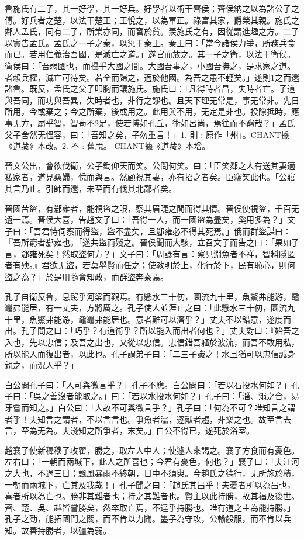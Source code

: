 \begin{pinyinscope}
魯施氏有二子，其一好學，其一好兵。好學者以術干齊侯；齊侯納之以為諸公子之傅。好兵者之楚，以法干楚王；王悅之，以為軍正。祿富其家，爵榮其親。施氏之鄰人孟氏，同有二子，所業亦同，而窘於貧。羨施氏之有，因從謂進趣之方。二子以實告孟氏。孟氏之一子之秦，以愆干秦王。秦王曰：「當今諸侯力爭，所務兵食而已。若用仁義治吾國，是滅亡之道。」遂官而放之。其一子之衛，以法干衛侯。衛侯曰：「吾弱國也，而攝乎大國之間。大國吾事之，小國吾撫之，是求家之道。者賴兵權，滅亡可待矣。若全而歸之，適於他國。為吾之患不輕矣。」遂則1之而還諸魯。既反，孟氏之父子叩胸而讓施氏。施氏曰：「凡得時者昌，失時者亡。子道與吾同，而功與吾異，失時者也，非行之謬也。且天下理无常是，事无常非。先日所用，今或棄之；今之所棄，後或用之。此用與不用，无定是非也。投隙抵時，應事无方，屬乎智，智苟不2足，使若博如孔丘，術如呂尚，焉往而不窮哉？」孟氏父子舍然无慍容，曰：「吾知之矣，子勿重言！」1. 則 : 原作「州」。CHANT據《道藏》本改。2. 不 : 舊脫。 CHANT據《道藏》本增。

晉文公出，會欲伐衛，公子鋤仰天而笑。公問何笑。曰：「臣笑鄰之人有送其妻適私家者，道見桑婦，悅而與言。然顧視其妻，亦有招之者矣。臣竊笑此也。「公寤其言乃止。引師而還，未至而有伐其北鄙者矣。

晉國苦盜，有郄雍者，能視盜之眼，察其眉睫之閒而得其情。晉侯使視盜，千百无遺一焉。晉侯大喜，告趙文子曰：「吾得一人，而一國盜為盡矣，奚用多為？」文子曰：「吾君恃伺察而得盜，盜不盡矣，且郄雍必不得其死焉。」俄而群盜謀曰：『吾所窮者郄雍也。「遂共盜而殘之。晉侯聞而大駭，立召文子而告之曰：「果如子言，郄雍死矣！然取盜何方？」文子曰：「周諺有言：察見淵魚者不祥，智料隱匿者有殃。』君欲无盜，若莫舉賢而任之；使教明於上，化行於下，民有恥心，則何盜之為？」於是用隨會知政，而群盜奔秦焉。

孔子自衛反魯，息駕乎河梁而觀焉。有懸水三十仞，圜流九十里，魚鱉弗能游，黿鼉弗能居，有一丈夫，方將厲之。孔子使人並涯止之曰：「此懸水三十仞，圜流九十里，魚鱉弗能游，黿鼉弗能居也。意者難可以濟乎？」丈夫不以錯意，遂度而出。孔子問之曰：「巧乎？有道術乎？所以能入而出者何也？」丈夫對曰：『始吾之入也，先以忠信；及吾之出也，又從以忠信。忠信錯吾軀於波流，而吾不敢用私，所以能入而復出者，以此也。孔子謂弟子曰：「二三子識之！水且猶可以忠信誠身親之，而況人乎？」

白公問孔子曰：「人可與微言乎？」孔子不應。白公問曰：「若以石投水何如？」孔子曰：「吳之善沒者能取之。」曰：「若以水投水何如？」孔子曰：「淄、澠之合，易牙嘗而知之。」白公曰：「人故不可與微言乎？」孔子曰：「何為不可？唯知言之謂者乎！夫知言之謂者，不以言言也。爭魚者濡，逐獸者趨，非樂之也。故至言去言，至為无為。夫淺知之所爭者，末矣。」白公不得已，遂死於浴室。

趙襄子使新穉穆子攻翟，勝之，取左人中人；使遽人來謁之。襄子方食而有憂色。左右曰：「一朝而兩城下，此人之所喜也；今君有憂色，何也？」襄子曰：「夫江河之大也，不過三日；飄風暴雨不終朝，日中不須臾。今趙氏之德行，无所施於積，一朝而兩城下，亡其及我哉！」孔子聞之曰：「趙氏其昌乎！夫憂者所以為昌也，喜者所以為亡也。勝非其難者也；持之其難者也。賢主以此持勝，故其福及後世。齊、楚、吳、越皆嘗勝矣，然卒取亡焉，不達乎持勝也。唯有道之主為能持勝。」孔子之勁，能拓國門之關，而不肯以力聞。墨子為守攻，公輸般服，而不肯以兵知。故善持勝者，以彊為弱。


\end{pinyinscope}
